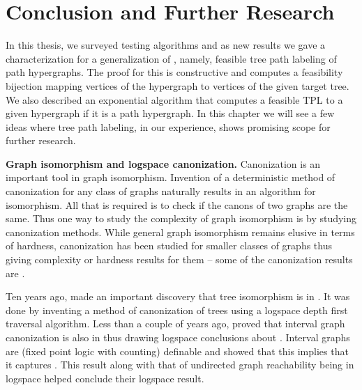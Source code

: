 \xclearpage

\chapter[Conclusion]{Conclusion and Further Research}
\label{ch:conclusion}

In this thesis, we surveyed \cop testing algorithms and as new results
we gave a characterization for a generalization of \COP, namely,
feasible tree path labeling of path hypergraphs. The proof for this is
constructive and computes a feasibility bijection mapping vertices of
the hypergraph to vertices of the given target tree. We also described
an exponential algorithm that computes a feasible TPL to a given
hypergraph if it is a path hypergraph.  In this chapter we will see a
few ideas where tree path labeling, in our experience, shows promising
scope for further research.

\parindent 0pt

\textbf{Graph isomorphism and logspace canonization.}  Canonization is
an important tool in graph isomorphism. Invention of a deterministic
method of canonization for any class of graphs naturally results in an
algorithm for isomorphism. All that is required is to check if the
canons of two graphs are the same. Thus one way to study the
complexity of graph isomorphism is by studying canonization
methods. While general graph isomorphism remains elusive in terms of
hardness, canonization has been studied for smaller classes of graphs
thus giving complexity or hardness results for them -- some of the
canonization results are \cite{sl92,dlntw09,adkk09,kklv10}.

Ten years ago, \cite{sl92} made an important discovery that tree
isomorphism is in \logspace. It was done by inventing a method of
canonization of trees using a logspace depth first traversal
algorithm.  Less than a couple of years ago, \cite{kklv10} proved that
interval graph canonization is also in \logspace thus drawing logspace
conclusions about \COT. Interval graphs are \fpplusc (fixed point
logic with counting) definable and \cite{l10} showed that this implies
that it captures \ptime. This result along with that of undirected
graph reachability being in logspace \cite{rei08} helped \cite{kklv10}
conclude their logspace result.

